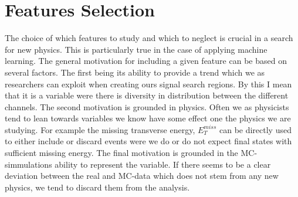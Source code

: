 \section{Features Selection}
The choice of which features to study and which to neglect is crucial in a search for new physics. This is particularly true 
in the case of applying machine learning. The general motivation for including a given feature can be based on several factors. 
The first being its ability to provide a trend which we as researchers can exploit when creating ours signal search regions. By this I mean
that it is a variable were there is diversity in distribution between the different channels. The second motivation is grounded in 
physics. Often we as physicists tend to lean towards variables we know have some effect one the physics we are studying. For 
example the missing transverse energy, $E_T^{miss}$ can be directly used to either include or discard events were we do or do not expect final states
with sufficient missing energy. The final motivation is grounded in the \ac{MC}-simmulations ability to represent the variable.
If there seems to be a clear deviation between the real and \ac{MC}-data which does not stem from any new physics, we tend to discard
them from the analysis.